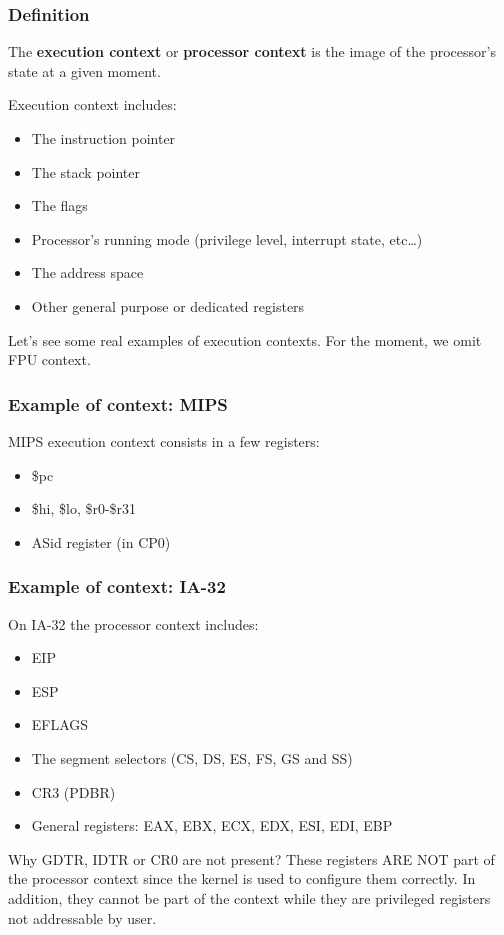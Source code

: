 
\begin{frame}
  \frametitle{Definition}

  The \textbf{execution context} or \textbf{processor context} is the
  image of the processor's state at a given moment.

  Execution context includes:

  \begin{itemize}
  \item
    The instruction pointer
  \item
    The stack pointer
  \item
    The flags
  \item
    Processor's running mode (privilege level, interrupt state,
    etc\ldots)
  \item
    The address space
  \item
    Other general purpose or dedicated registers
  \end{itemize}

  \-

  Let's see some real examples of execution contexts. For the moment,
  we omit FPU context.

\end{frame}


\begin{frame}
  \frametitle{Example of context: MIPS}

  MIPS execution context consists in a few registers:

  \begin{itemize}
  \item
    \$pc
  \item
    \$hi, \$lo, \$r0-\$r31
  \item
    ASid register (in CP0)
  \end{itemize}

\end{frame}


\begin{frame}
  \frametitle{Example of context: IA-32}

  On IA-32 the processor context includes:

  \begin{itemize}
  \item
    EIP
  \item
    ESP
  \item
    EFLAGS
  \item
    The segment selectors (CS, DS, ES, FS, GS and SS)
  \item
    CR3 (PDBR)
  \item
    General registers: EAX, EBX, ECX, EDX, ESI, EDI, EBP
  \end{itemize}

  \-

  Why GDTR, IDTR or CR0 are not present? These registers ARE NOT part
  of the processor context since the kernel is used to configure them
  correctly. In addition, they cannot be part of the context while
  they are privileged registers not addressable by user.

\end{frame}

